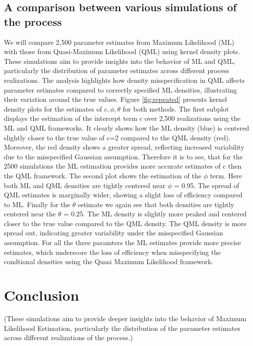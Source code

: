 \documentclass[11pt]{article}
\begin{document}
\subsection{A comparison between various simulations of the process}
We will compare 2,500 parameter estimates from Maximum Likelihood (ML) with those from Quasi-Maximum Likelihood (QML) using kernel density plots. These simulations aim to provide insights into the behavior of ML and QML, particularly the distribution of parameter estimates across different process realizations. The analysis highlights how density misspecification in QML affects parameter estimates compared to correctly specified ML densities, illustrating their variation around the true values. Figure \ref{fig:repeated} presents kernel density plots for the estimates of  $c, \phi,\theta$ for both methods.
The first subplot displays the estimation of the intercept term $c$ over 2,500 realizations using the ML and QML frameworks. 
It clearly shows how the ML density (blue) is centered slightly closer to the true value of c=2 compared to the QML density (red). 
Moreover, the red density shows a greater spread, reflecting increased variability due to the misspecified Gaussian assumption.
Therefore it is to see, that for the 2500 simulations the ML estimation provides more accurate estimates of c then the QML framework.
The second plot shows the estimation of the $\phi$ term. 
Here both ML and QML densities are tightly centered near $\phi$ = 0.95. The spread of QML estimates is marginally wider, showing a slight loss of efficiency compared to ML. 
Finally for the $\theta$ estimate we again see that both densities are tightly centered near the $\theta$ = 0.25. The ML density is slightly more peaked and centered closer to the true value compared to the QML density. The QML density is more spread out, indicating greater variability under the misspecified Gaussian assumption.
For all the three paramters the ML estimates provide more precise estimates, which underscore the loss of efficiency when misspecifying the condtional densities using the Quasi Maximum Likelihood framework.




\section{Conclusion}
(These simulations aim to provide deeper insights into the behavior of Maximum Likelihood Estimation, particularly the distribution of the parameter estimates across different realizations of the process.)
\end{document}
